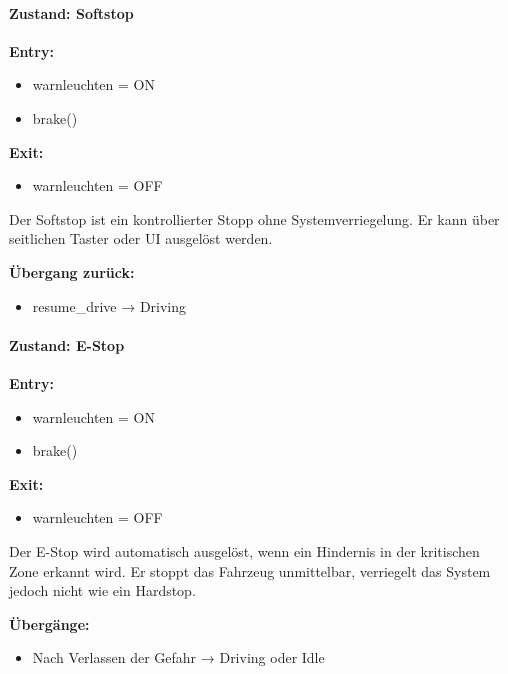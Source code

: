 \paragraph{Zustand: Softstop}

\textbf{Entry:}
\begin{itemize}
    \item warnleuchten = ON
    \item brake()
\end{itemize}

\textbf{Exit:}
\begin{itemize}
    \item warnleuchten = OFF
\end{itemize}

Der Softstop ist ein kontrollierter Stopp ohne Systemverriegelung. Er kann über
seitlichen Taster oder UI ausgelöst werden.

\textbf{Übergang zurück:}
\begin{itemize}
    \item resume\_drive → Driving
\end{itemize}


\paragraph{Zustand: E-Stop}

\textbf{Entry:}
\begin{itemize}
    \item warnleuchten = ON
    \item brake()
\end{itemize}

\textbf{Exit:}
\begin{itemize}
    \item warnleuchten = OFF
\end{itemize}

Der \ac{E-Stop} wird automatisch ausgelöst, wenn ein Hindernis in der kritischen Zone
erkannt wird. Er stoppt das Fahrzeug unmittelbar, verriegelt das System jedoch
nicht wie ein \ac{Hardstop}.

\textbf{Übergänge:}
\begin{itemize}
    \item Nach Verlassen der Gefahr → Driving oder Idle
\end{itemize}


